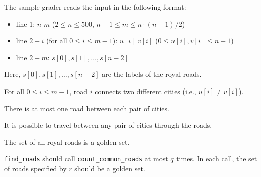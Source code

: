The sample grader reads the input in the following format:
\begin{itemize}
\item line 1: $n$ $m$ ($2 \leq n \leq 500$, $n - 1 \leq m \leq n \cdot (n - 1) / 2$)
\item line $2 + i$ (for all $0 \leq i \leq m - 1$): $u[i]$ $v[i]$ ($0 \leq u[i], v[i] \leq n - 1$)
\item line $2 + m$: $s[0], s[1], \ldots, s[n - 2]$
\end{itemize}

Here, $s[0], s[1], \ldots, s[n - 2]$ are the labels of the royal roads.

For all $0 \leq i \leq m - 1$, road $i$ connects two different cities (i.e., $u[i] \neq v[i]$).

There is at most one road between each pair of cities.

It is possible to travel between any pair of cities through the roads.

The set of all royal roads is a golden set.

\texttt{find\_roads} should call \texttt{count\_common\_roads} at most $q$ times.
In each call, the set of roads specified by $r$ should be a golden set.